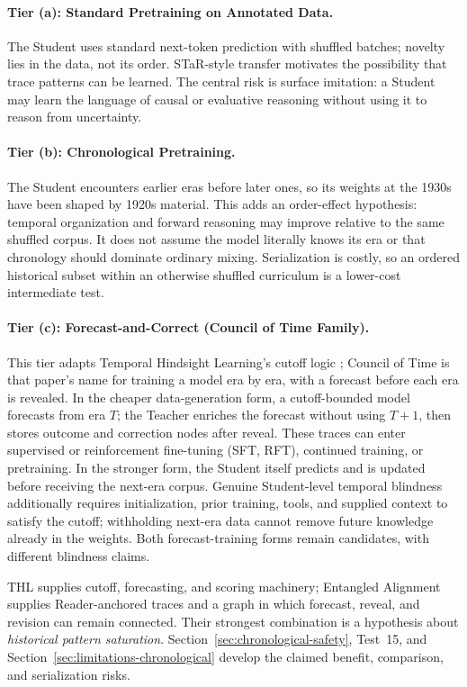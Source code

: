 \documentclass[11pt]{article}
\begin{document}
\paragraph{Tier (a): Standard Pretraining on Annotated Data.} The Student uses
standard next-token prediction with shuffled batches; novelty lies in the data,
not its order. STaR-style transfer motivates the possibility that trace patterns
can be learned. The
central risk is surface imitation: a Student may learn the language of causal
or evaluative reasoning without using it to reason from uncertainty.

\paragraph{Tier (b): Chronological Pretraining.} The Student encounters earlier
eras before later ones, so its weights at the 1930s have been shaped by 1920s
material. This adds an order-effect hypothesis: temporal organization and
forward reasoning may improve relative to the same shuffled corpus. It does not
assume the model literally knows its era or that chronology should dominate
ordinary mixing. Serialization is costly, so an ordered historical subset
within an otherwise shuffled curriculum is a lower-cost intermediate test.

\paragraph{Tier (c): Forecast-and-Correct (Council of Time Family).} This tier
adapts Temporal Hindsight Learning's cutoff logic \cite{westerberg2026thl};
Council of Time is that paper's name for training a model era by era, with a
forecast before each era is revealed. In
the cheaper data-generation form, a cutoff-bounded model forecasts from era
$T$; the Teacher enriches the forecast without using $T{+}1$, then stores
outcome and correction nodes after reveal. These traces can enter supervised or reinforcement fine-tuning (SFT, RFT),
continued training, or pretraining. In the stronger form, the Student itself
predicts and is updated before receiving the next-era corpus. Genuine Student-level temporal blindness additionally requires initialization,
prior training, tools, and supplied context to satisfy the cutoff; withholding
next-era data cannot remove future knowledge already in the weights. Both
forecast-training forms remain candidates, with different blindness claims.

THL supplies cutoff, forecasting, and scoring machinery; Entangled Alignment
supplies Reader-anchored traces and a graph in which forecast, reveal, and
revision can remain connected. Their strongest combination is a hypothesis
about \emph{historical pattern saturation}. Section~\ref{sec:chronological-safety},
Test~15, and Section~\ref{sec:limitations-chronological} develop the claimed
benefit, comparison, and serialization risks.
\end{document}
